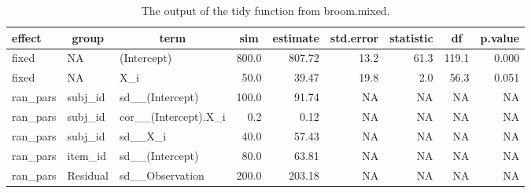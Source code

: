 \documentclass[
  english,
  doc,floatsintext]{apa6}
\newenvironment{Shaded}{\begin{snugshade}}{\end{snugshade}}
\newcommand{\CommentTok}[1]{\textcolor[rgb]{0.56,0.35,0.01}{\textit{#1}}}
\newcommand{\DataTypeTok}[1]{\textcolor[rgb]{0.13,0.29,0.53}{#1}}
\newcommand{\DecValTok}[1]{\textcolor[rgb]{0.00,0.00,0.81}{#1}}
\newcommand{\KeywordTok}[1]{\textcolor[rgb]{0.13,0.29,0.53}{\textbf{#1}}}
\newcommand{\NormalTok}[1]{#1}
\newcommand{\OperatorTok}[1]{\textcolor[rgb]{0.81,0.36,0.00}{\textbf{#1}}}
\newcommand{\StringTok}[1]{\textcolor[rgb]{0.31,0.60,0.02}{#1}}
\begin{document}
\begin{Shaded}
\end{Shaded}

\begin{table}[H]

\begin{center}
\begin{threeparttable}

\caption{\label{tab:broom-tidy-table}The output of the tidy function from broom.mixed.}

\footnotesize{

\begin{tabular}{lllrrrrrr}
\toprule
effect & \multicolumn{1}{c}{group} & \multicolumn{1}{c}{term} & \multicolumn{1}{c}{sim} & \multicolumn{1}{c}{estimate} & \multicolumn{1}{c}{std.error} & \multicolumn{1}{c}{statistic} & \multicolumn{1}{c}{df} & \multicolumn{1}{c}{p.value}\\
\midrule
fixed & NA & (Intercept) & 800.0 & 807.72 & 13.2 & 61.3 & 119.1 & 0.000\\
fixed & NA & X\_i & 50.0 & 39.47 & 19.8 & 2.0 & 56.3 & 0.051\\
ran\_pars & subj\_id & sd\_\_(Intercept) & 100.0 & 91.74 & NA & NA & NA & NA\\
ran\_pars & subj\_id & cor\_\_(Intercept).X\_i & 0.2 & 0.12 & NA & NA & NA & NA\\
ran\_pars & subj\_id & sd\_\_X\_i & 40.0 & 57.43 & NA & NA & NA & NA\\
ran\_pars & item\_id & sd\_\_(Intercept) & 80.0 & 63.81 & NA & NA & NA & NA\\
ran\_pars & Residual & sd\_\_Observation & 200.0 & 203.18 & NA & NA & NA & NA\\
\bottomrule
\end{tabular}

}

\end{threeparttable}
\end{center}

\end{table}
\end{document}
